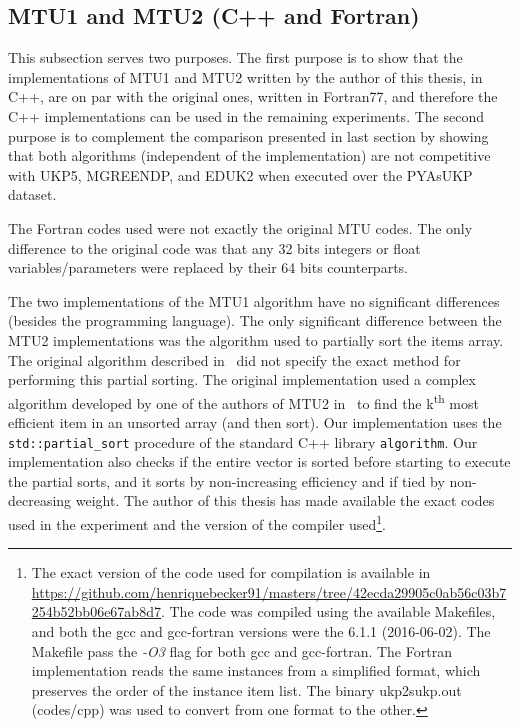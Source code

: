\subsection{MTU1 and MTU2 (C++ and Fortran)}
\label{sec:mtu_exp}

This subsection serves two purposes.
The first purpose is to show that the implementations of MTU1 and MTU2 written by the author of this thesis, in C++, are on par with the original ones, written in Fortran77, and therefore the C++ implementations can be used in the remaining experiments.
The second purpose is to complement the comparison presented in last section by showing that both algorithms (independent of the implementation) are not competitive with UKP5, MGREENDP, and EDUK2 when executed over the PYAsUKP dataset. %

The Fortran codes used were not exactly the original MTU codes.
The only difference to the original code was that any 32 bits integers or float variables/parameters were replaced by their 64 bits counterparts. 

The two implementations of the MTU1 algorithm have no significant differences (besides the programming language).
The only significant difference between the MTU2 implementations was the algorithm used to partially sort the items array.
The original algorithm described in~\cite{mtu2} did not specify the exact method for performing this partial sorting.
The original implementation used a complex algorithm developed by one of the authors of MTU2 in~\cite{partial_sort_martello} to find the k\textsuperscript{th} most efficient item in an unsorted array (and then sort).
Our implementation uses the \verb+std::partial_sort+ procedure of the standard C++ library \verb+algorithm+.
Our implementation also checks if the entire vector is sorted before starting to execute the partial sorts, and it sorts by non-increasing efficiency and if tied by non-decreasing weight.
The author of this thesis has made available the exact codes used in the experiment and the version of the compiler used\footnote{The exact version of the code used for compilation is available in \url{https://github.com/henriquebecker91/masters/tree/42ecda29905c0ab56c03b7254b52bb06e67ab8d7}. The code was compiled using the available Makefiles, and both the gcc and gcc-fortran versions were the 6.1.1 (2016-06-02). The Makefile pass the \emph{-O3} flag for both gcc and gcc-fortran. The Fortran implementation reads the same instances from a simplified format, which preserves the order of the instance item list. The binary ukp2sukp.out (codes/cpp) was used to convert from one format to the other.}.

